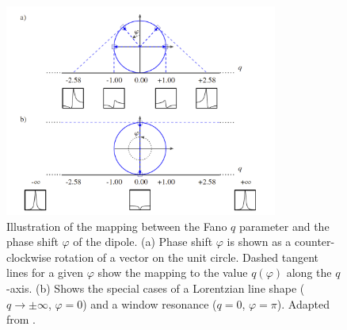 \begin{figure}
	\centering
	\includegraphics[width=0.8\textwidth]{figures/ATS/Kaldun.png}
	\caption[Illustration of the mapping between the $q-$parameter and the phase shift of the dipole]{Illustration of the mapping between the Fano $q$ parameter and the phase shift $\varphi$ of the dipole. (a) Phase shift $\varphi$ is shown as a counter-clockwise rotation of a vector on the unit circle. Dashed tangent lines for a given $\varphi$ show the mapping to the value $q(\varphi)$ along the $q$-axis. (b) Shows the special cases of a Lorentzian line shape ($q\rightarrow\pm\infty$, $\varphi=0$) and a window resonance ($q=0$, $\varphi=\pi$).  Adapted from \cite{kaldunFanoResonancesTime2014}.}
	\label{fig:q_to_phi}
\end{figure}

